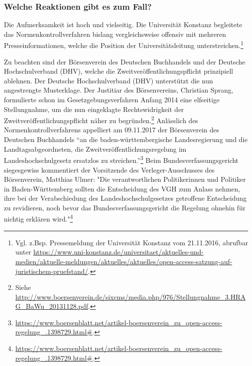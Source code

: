 \documentclass[a4paper,
fontsize=11pt,
oneside,
numbers=noperiodatend,
parskip=half-,
bibliography=totoc,
final
]{scrartcl}
\begin{document}
\hypertarget{welche-reaktionen-gibt-es-zum-fall}{%
\subsubsection{Welche Reaktionen gibt es zum
Fall?}\label{welche-reaktionen-gibt-es-zum-fall}}

Die Aufmerksamkeit ist hoch und vielseitig. Die Universität Konstanz
begleitete das Normenkontrollverfahren bislang vergleichsweise offensiv
mit mehreren Presseinformationen, welche die Position der
Universitätsleitung unterstreichen.\footnote{Vgl. z.Bsp. Pressemeldung
  der Universität Konstanz vom 21.11.2016, abrufbar unter
  \url{https://www.uni-konstanz.de/universitaet/aktuelles-und-medien/aktuelle-meldungen/aktuelles/aktuelles/open-access-satzung-auf-juristischem-pruefstand/}.}

Zu beachten sind der Börsenverein des Deutschen Buchhandels und der
Deutsche Hochschulverband (DHV), welche die
Zweit\-ver\-öffent\-lich\-ungs\-pflicht prinzipiell ablehnen. Der Deutsche
Hochschulverband (DHV) unterstützt die nun angestrengte Musterklage. Der
Justitiar des Börsenvereins, Christian Sprang, formulierte schon im
Gesetzgebungsverfahren Anfang 2014 eine elfseitige Stellungnahme, um die
nun eingeklagte Rechtswidrigkeit der Zweit\-ver\-öffent\-lich\-ungs\-pflicht näher
zu begründen.\footnote{Siehe
  \url{http://www.boersenverein.de/sixcms/media.php/976/Stellungnahme_3.HRAG_BaWu_20131128.pdf}.}
Anlässlich des Normenkontrollverfahrens appelliert am 09.11.2017 der
Börsenverein des Deutschen Buchhandels \enquote{an die
baden-württembergische Landesregierung und die Landtagsabgeordneten, die
Zweitveröffentlichungsregelung im Landeshochschulgesetz ersatzlos zu
streichen.}\footnote{\href{https://www.boersenblatt.net/artikel-boersenverein_zu_open-access-regelung_.1398729.html}{https://www.boersenblatt.net/artikel-boersenverein\_zu\_open-access-regelung\_.1398729.html\#}.}
Beim Bundesverfassungsgericht siegesgewiss kommentiert der Vorsitzende
des Verleger-Ausschusses des Börsenverein, Matthias Ulmer: "Die
verantwortlichen Politikerinnen und Politiker in Baden-Württemberg
sollten die Entscheidung des VGH zum Anlass nehmen, ihre bei der
Verabschiedung des Landeshochschulgesetzes getroffene Entscheidung zu
revidieren, noch bevor das Bundesverfassungsgericht die Regelung ohnehin
für nichtig erklären wird."\footnote{\href{https://www.boersenblatt.net/artikel-boersenverein_zu_open-access-regelung_.1398729.html}{https://www.boersenblatt.net/artikel-boersenverein\_zu\_open-access-regelung\_.1398729.html\#}.}
\end{document}
